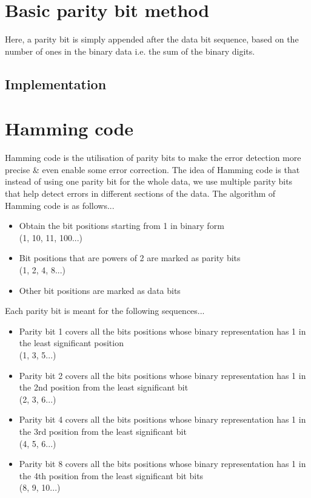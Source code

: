 \section{Basic parity bit method}
Here, a parity bit is simply appended after the data bit sequence, based on the number of ones in the binary data i.e. the sum of the binary digits.

\subsection{Implementation}


\section{Hamming code}
Hamming code is the utilisation of parity bits to make the error detection more precise \& even enable some error correction. The idea of Hamming code is that instead of using one parity bit for the whole data, we use multiple parity bits that help detect errors in different sections of the data. The algorithm of Hamming code is as follows...

\begin{itemize}
	\item Obtain the bit positions starting from 1 in binary form\\(1, 10, 11, 100...)
	\item Bit positions that are powers of 2 are marked as parity bits\\(1, 2, 4, 8...)
	\item Other bit positions are marked as data bits
\end{itemize}

Each parity bit is meant for the following sequences...

\begin{itemize}
	\item Parity bit 1 covers all the bits positions whose binary representation has 1 in the least significant position\\(1, 3, 5...)
	\item Parity bit 2 covers all the bits positions whose binary representation has 1 in the 2nd position from the least significant bit\\(2, 3, 6...)
	\item Parity bit 4 covers all the bits positions whose binary representation has 1 in the 3rd position from the least significant bit\\(4, 5, 6...)
	\item Parity bit 8 covers all the bits positions whose binary representation has 1 in the 4th position from the least significant bit bits\\(8, 9, 10...)
\end{itemize}

